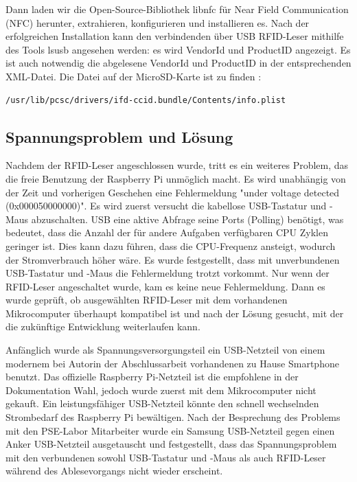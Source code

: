 Dann laden wir die Open-Source-Bibliothek libnfc für Near Field Communication (NFC) herunter, extrahieren, konfigurieren und installieren es. Nach der erfolgreichen Installation kann den verbindenden über USB RFID-Leser mithilfe des Tools lsusb angesehen werden: es wird VendorId und ProductID angezeigt. Es ist auch notwendig die abgelesene VendorId und ProductID in der entsprechenden XML-Datei. Die Datei auf der MicroSD-Karte ist zu finden :
\begin{lstlisting}[caption={[XML-Datei für VendorId und ProductID] },captionpos=b]
/usr/lib/pcsc/drivers/ifd-ccid.bundle/Contents/info.plist
\end{lstlisting}

\subsection{Spannungsproblem und Lösung}
\label{sec:register_client:voltage_issue}
Nachdem der RFID-Leser angeschlossen wurde, tritt es ein weiteres Problem, das die freie Benutzung der Raspberry Pi unmöglich macht. Es wird unabhängig von der Zeit und vorherigen Geschehen eine Fehlermeldung "under voltage detected (0x000050000000)". Es wird zuerst versucht die kabellose USB-Tastatur und -Maus abzuschalten. USB eine aktive Abfrage seine Ports (Polling) benötigt, was bedeutet, dass die Anzahl der für andere Aufgaben verfügbaren CPU Zyklen geringer ist. Dies kann dazu führen, dass die CPU-Frequenz ansteigt, wodurch der Stromverbrauch höher wäre. Es wurde festgestellt, dass mit unverbundenen USB-Tastatur und -Maus die Fehlermeldung trotzt vorkommt. Nur wenn der RFID-Leser angeschaltet wurde, kam es keine neue Fehlermeldung. Dann es wurde geprüft, ob ausgewählten RFID-Leser mit dem vorhandenen Mikrocomputer überhaupt kompatibel ist und nach der Lösung gesucht, mit der die zukünftige Entwicklung weiterlaufen kann.    

Anfänglich wurde als Spannungsversorgungsteil ein USB-Netzteil von einem modernem bei Autorin der Abschlussarbeit vorhandenen zu Hause Smartphone benutzt. Das offizielle Raspberry Pi-Netzteil ist die empfohlene in der Dokumentation Wahl, jedoch wurde zuerst mit dem Mikrocomputer nicht gekauft. Ein leistungsfähiger USB-Netzteil könnte den schnell wechselnden Strombedarf des Raspberry Pi bewältigen. Nach der Besprechung des Problems mit den PSE-Labor Mitarbeiter wurde ein Samsung USB-Netzteil gegen einen Anker USB-Netzteil ausgetauscht und festgestellt, dass das Spannungsproblem mit den verbundenen sowohl USB-Tastatur und -Maus als auch RFID-Leser während des Ablesevorgangs nicht wieder erscheint. 

